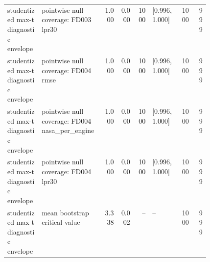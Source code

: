 \begin{table}[!t]
{\begin{tabular}{p{0.17\linewidth}p{0.31\linewidth}rrrlrr}
studentized max-t diagnostic envelope & pointwise null coverage: FD003 lpr30 & 1.000 & 0.000 & 1000 & [0.996, 1.000] & 1000 & 999 \\
studentized max-t diagnostic envelope & pointwise null coverage: FD004 rmse & 1.000 & 0.000 & 1000 & [0.996, 1.000] & 1000 & 999 \\
studentized max-t diagnostic envelope & pointwise null coverage: FD004 nasa\_per\_engine & 1.000 & 0.000 & 1000 & [0.996, 1.000] & 1000 & 999 \\
studentized max-t diagnostic envelope & pointwise null coverage: FD004 lpr30 & 1.000 & 0.000 & 1000 & [0.996, 1.000] & 1000 & 999 \\
studentized max-t diagnostic envelope & mean bootstrap critical value & 3.338 & 0.002 & -- & -- & 1000 & 999 \\
\bottomrule
\end{tabular}
}
\end{table}
